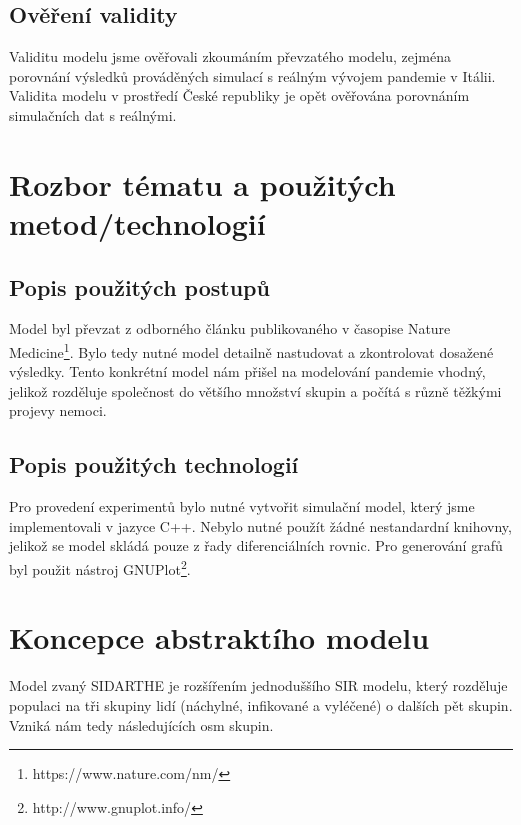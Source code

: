 \documentclass[a4paper,11pt]{article}
\begin{document}
	\subsection{Ověření validity}
		Validitu modelu jsme ověřovali zkoumáním převzatého modelu, zejména porovnání výsledků prováděných simulací s reálným vývojem pandemie v Itálii. Validita modelu v prostředí České republiky je opět ověřována porovnáním simulačních dat s reálnými.
	
	\section{Rozbor tématu a použitých metod/technologií}
		
	
	\subsection{Popis použitých postupů}
		Model byl převzat z odborného článku \cite{source} publikovaného v časopise Nature Medicine\footnote{https://www.nature.com/nm/}. Bylo tedy nutné model detailně nastudovat a zkontrolovat dosažené výsledky. Tento konkrétní model nám přišel na modelování pandemie vhodný, jelikož rozděluje společnost do většího množství skupin a počítá s různě těžkými projevy nemoci.
	
	\subsection{Popis použitých technologií}
		Pro provedení experimentů bylo nutné vytvořit simulační model, který jsme implementovali v jazyce C++. Nebylo nutné použít žádné nestandardní knihovny, jelikož se model skládá pouze z řady diferenciálních rovnic. Pro generování grafů byl použit nástroj GNUPlot\footnote{http://www.gnuplot.info/}.
			
	\section{Koncepce abstraktího modelu}
		Model zvaný SIDARTHE je rozšířením jednoduššího SIR modelu, který rozděluje populaci na tři skupiny lidí (náchylné, infikované a vyléčené) o dalších pět skupin. Vzniká nám tedy následujících osm skupin.
		
\end{document}
